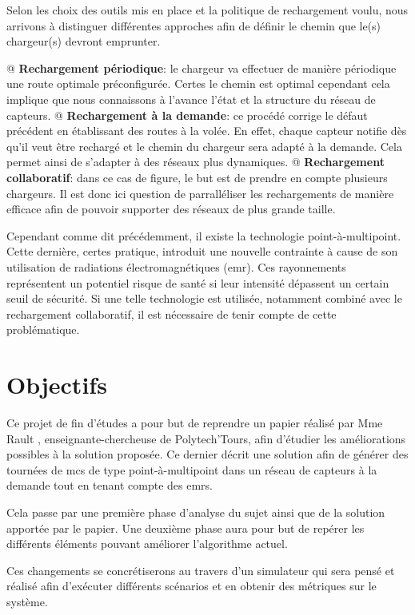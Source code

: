 \documentclass[final]{polytech/polytech}
\begin{document}
		Selon les choix des outils mis en place et la politique de rechargement voulu, nous arrivons à distinguer différentes approches afin de définir le chemin que le(s) chargeur(s) devront emprunter.
		\begin{easylist}[itemize]
			@ \textbf{Rechargement périodique}: le chargeur va effectuer de manière périodique une route optimale préconfigurée.
			Certes le chemin est optimal cependant cela implique que nous connaissons à l'avance l'état et la structure du réseau de capteurs.
			@ \textbf{Rechargement à la demande}: ce procédé corrige le défaut précédent en établissant des routes à la volée.
			En effet, chaque capteur notifie dès qu'il veut être rechargé et le chemin du chargeur sera adapté à la demande.
			Cela permet ainsi de s'adapter à des réseaux plus dynamiques.
			@ \textbf{Rechargement collaboratif}: dans ce cas de figure, le but est de prendre en compte plusieurs chargeurs.
			Il est donc ici question de parralléliser les rechargements de manière efficace afin de pouvoir supporter des réseaux de plus grande taille. 
		\end{easylist}
	
		Cependant comme dit précédemment, il existe la technologie point-à-multipoint.
		Cette dernière, certes pratique, introduit une nouvelle contrainte à cause de son utilisation de radiations électromagnétiques (\gls{emr}).
		Ces rayonnements représentent un potentiel risque de santé si leur intensité dépassent un certain seuil de sécurité.
		Si une telle technologie est utilisée, notamment combiné avec le rechargement collaboratif, il est nécessaire de tenir compte de cette problématique.
		
	\section{Objectifs}
		Ce projet de fin d'études a pour but de reprendre un papier réalisé par Mme Rault \cite{Rault:chargers}, enseignante-chercheuse de Polytech'Tours, afin d'étudier les améliorations possibles à la solution proposée.
		Ce dernier décrit une solution afin de générer des tournées de \glspl{mc} de type point-à-multipoint dans un réseau de capteurs à la demande tout en tenant compte des \glspl{emr}.
		
		Cela passe par une première phase d'analyse du sujet ainsi que de la solution apportée par le papier.
		Une deuxième phase aura pour but de repérer les différents éléments pouvant améliorer l'algorithme actuel.
		
		Ces changements se concrétiserons au travers d'un simulateur qui sera pensé et réalisé afin d'exécuter différents scénarios et en obtenir des métriques sur le système.
	
\end{document}
